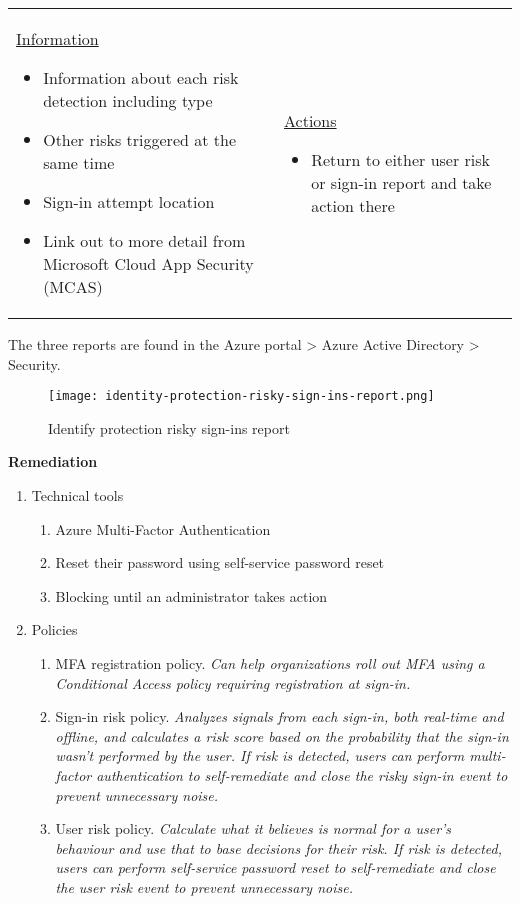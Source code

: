 \begin{itemize}
	\begin{tabular}{p{7cm}p{7cm}}
	\underline{Information}
		\begin{itemize}
		\item Information about each risk detection including type
		\item Other risks triggered at the same time
		\item Sign-in attempt location
		\item Link out to more detail from Microsoft Cloud App Security (MCAS)
		\end{itemize} &
	\underline{Actions}
		\begin{itemize}
		\item Return to either user risk or sign-in report and take action there
		\end{itemize}
	\end{tabular}
\end{itemize}
The three reports are found in the Azure portal > Azure Active Directory > Security.
\begin{figure}[!h]
\centering
\texttt{[image: identity-protection-risky-sign-ins-report.png]}
\caption{Identify protection risky sign-ins report}
\end{figure}

\textbf{Remediation}
\begin{enumerate}
\item Technical tools
	\begin{enumerate}
	\item Azure Multi-Factor Authentication
	\item Reset their password using self-service password reset
	\item Blocking until an administrator takes action
	\end{enumerate}
\item Policies
	\begin{enumerate}
	\item MFA registration policy. \textit{Can help organizations roll out MFA using a Conditional Access policy requiring registration at sign-in.}
	\item Sign-in risk policy. \textit{Analyzes signals from each sign-in, both real-time and offline, and calculates a risk score based on the probability that the sign-in wasn't performed by the user. If risk is detected, users can perform multi-factor authentication to self-remediate and close the risky sign-in event to prevent unnecessary noise.}
	\item User risk policy. \textit{Calculate what it believes is normal for a user's behaviour and use that to base decisions for their risk. If risk is detected, users can perform self-service password reset to self-remediate and close the user risk event to prevent unnecessary noise.}
	\end{enumerate}
\end{enumerate}

